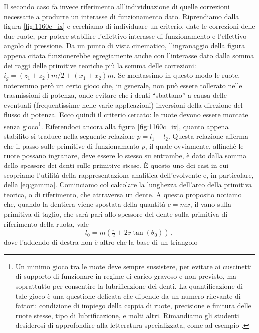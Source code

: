 Il secondo caso fa invece riferimento
all'individuazione di quelle correzioni necessarie a produrre un interasse
di funzionamento dato.
Riprendiamo dalla figura \ref{fig:1160c_ix} e cerchiamo di individuare
un criterio, date le correzioni delle due ruote, per potere stabilire
l'effettivo interasse di funzionamento e l'effettivo angolo di pressione.
Da un punto di vista cinematico, l'ingranaggio della figura appena citata
funzionerebbe egregiamente anche con l'interasse dato dalla somma dei
raggi delle primitive teoriche pi\`u la somma delle correzioni:
$i_g=(z_1 +z_2) m /2 +(x_1+x_2)m$. Se montassimo in questo modo le ruote,
noteremmo per\`o un certo gioco che, in generale, non pu\`o essere tollerato
nelle trasmissioni di potenza, onde evitare che i denti ``sbattano''
 a causa delle eventuali (frequentissime nelle varie
applicazioni) inversioni della direzione del flusso di
potenza. Ecco quindi il criterio cercato: le ruote devono essere montate senza gioco\footnote{
Un minimo gioco tra le ruote deve sempre sussistere, per evitare ai cuscinetti
di supporto di funzionare in regime di carico gravoso e non previsto,
ma soprattutto per consentire la lubrificazione dei denti. La 
quantificazione di tale gioco \`e una questione delicata che dipende da
un numero rilevante di fattori: condizione di impiego della coppia di ruote,
precisione e finitura 
delle ruote stesse, tipo di lubrificazione, e molti altri. Rimandiamo
gli studenti desiderosi di approfondire alla letteratura specializzata, 
come ad esempio \cite{henriot}.
}.
Riferendoci ancora alla figura \ref{fig:1160c_ix}, quanto appena stabilito
si traduce nella seguente relazione $p=l_1 + l_2$. Questa relazione afferma
che il passo sulle primitive di funzionamento $p$, il quale ovviamente,
affinch\'e le ruote possano ingranare, deve essere lo stesso
su entrambe, \`e dato dalla
somma dello spessore dei denti sulle primitive stesse.
\`E questo uno dei casi in cui scopriamo l'utilit\`a della rappresentazione
analitica dell'evolvente e, in particolare, della \ref{eq:gamma}.
Cominciamo col calcolare la lunghezza dell'arco della primitiva teorica, o
di riferimento,
che attraversa un dente. A questo proposito notiamo che, quando la dentiera viene
spostata della quantit\`a $c=mx$, il vano sulla primitiva di taglio, che sar\`a
pari allo spessore del dente sulla primitiva di riferimento della ruota, vale
\begin{equation}
l_0= m \left( \tfrac{\pi}{2} + 2 x \tan(\theta_0) \right)\,,
\label{eq:l0}
\end{equation}
\noindent dove l'addendo di destra non \`e altro che la base di un triangolo
